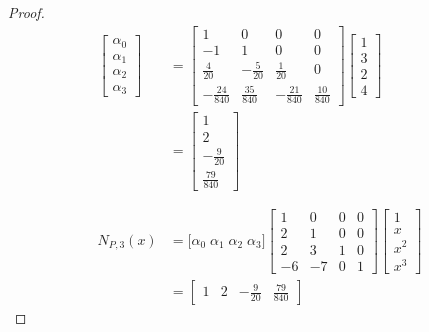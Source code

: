 \begin{proof}
  \begin{align*}
  \left[\begin{array}{l}
    \alpha_0 \\
    \alpha_1 \\
    \alpha_2 \\
    \alpha_3 
  \end{array}\right]
    &= \left[\begin{array}{*{4}{r}}
          1 & 0 & 0 & 0 \\
         -1 & 1 & 0 & 0 \\
         \frac{4}{20} &-\frac{5}{20} & \frac{1}{20} & 0 \\
          -\frac{24}{840} &\frac{35}{840} & -\frac{21}{840} & \frac{10}{840}
       \end{array}\right]
       \left[\begin{array}{l}
         1 \\
         3 \\
         2 \\
         4 
       \end{array}\right]
  \\&= \left[\begin{array}{l}
         1 \\
         2 \\
         -\frac{9}{20} \\
         \frac{79}{840} 
       \end{array}\right]
  \\
  \\
  \\
  N_{P,3}(x)
    &= \Big[ \alpha_0 \; \alpha_1 \; \alpha_2 \; \alpha_3 \Big] 
       \left[\begin{array}{rrrr}
          1  &   0  & 0  & 0  \\
          2  &   1  & 0  & 0  \\
          2  &   3  & 1  & 0  \\
         -6  &  -7  & 0  & 1
       \end{array}\right]
       \left[\begin{array}{l}
         1   \\
         x   \\
         x^2 \\
         x^3
       \end{array}\right]
  \\&= \left[\begin{array}{c|c|c|c} 
         1 & 2 & -\frac{9}{20} & \frac{79}{840} 
       \end{array}\right]

\end{align*}
\end{proof}
